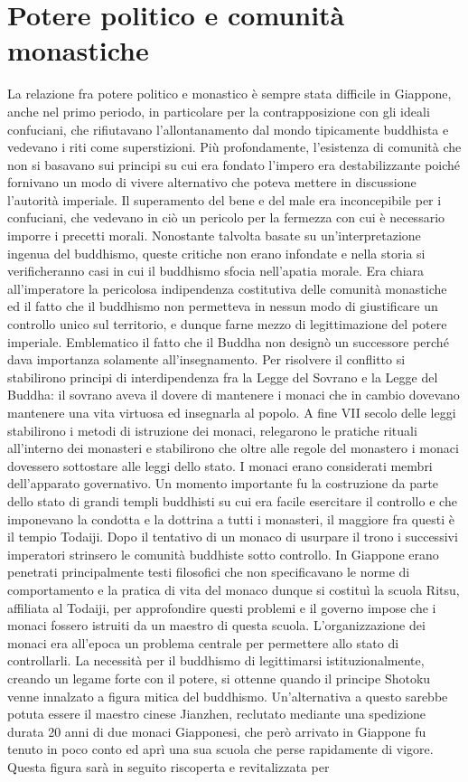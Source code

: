 \documentclass[10pt,a4paper]{report}
\begin{document}
\section{Potere politico e comunità monastiche}
La relazione fra potere politico e monastico è sempre stata difficile in Giappone, anche nel primo periodo, in particolare per la contrapposizione con gli ideali confuciani, che rifiutavano l'allontanamento dal mondo tipicamente buddhista e vedevano i riti come superstizioni. Più profondamente, l'esistenza di comunità che non si basavano sui principi su cui era fondato l'impero era destabilizzante poiché fornivano un modo di vivere alternativo che poteva mettere in discussione l'autorità imperiale. Il superamento del bene e del male era inconcepibile per i confuciani, che vedevano in ciò un pericolo per la fermezza con cui è necessario imporre i precetti morali. Nonostante talvolta basate su un'interpretazione ingenua del buddhismo, queste critiche non erano infondate e nella storia si verificheranno casi in cui il buddhismo sfocia nell'apatia morale. Era chiara all'imperatore la pericolosa indipendenza costitutiva delle comunità monastiche ed il fatto che il buddhismo non permetteva in nessun modo di giustificare un controllo unico sul territorio, e dunque farne mezzo di legittimazione del potere imperiale. Emblematico il fatto che il Buddha non designò un successore perché dava importanza solamente all'insegnamento. Per risolvere il conflitto si stabilirono principi di interdipendenza fra la Legge del Sovrano e la Legge del Buddha: il sovrano aveva il dovere di mantenere i monaci che in cambio dovevano mantenere una vita virtuosa ed insegnarla al popolo. A fine VII secolo delle leggi stabilirono i metodi di istruzione dei monaci, relegarono le pratiche rituali all'interno dei monasteri e stabilirono che oltre alle regole del monastero i monaci dovessero sottostare alle leggi dello stato. I monaci erano considerati membri dell'apparato governativo. Un momento importante fu la costruzione da parte dello stato di grandi templi buddhisti su cui era facile esercitare il controllo e che imponevano la condotta e la dottrina a tutti i monasteri, il maggiore fra questi è il tempio Todaiji. Dopo il tentativo di un monaco di usurpare il trono i successivi imperatori strinsero le comunità buddhiste sotto controllo. In Giappone erano penetrati principalmente testi filosofici che non specificavano le norme di comportamento e la pratica di vita del monaco dunque si costituì la scuola Ritsu, affiliata al Todaiji,  per approfondire questi problemi e il governo impose che i monaci fossero istruiti da un maestro di questa scuola. L'organizzazione dei monaci era all'epoca un problema centrale per permettere allo stato di controllarli. La necessità per il buddhismo di legittimarsi istituzionalmente, creando un legame forte con il potere, si ottenne quando il principe Shotoku venne innalzato a figura mitica del buddhismo. Un'alternativa a questo sarebbe potuta essere il maestro cinese Jianzhen, reclutato mediante una spedizione durata 20 anni di due monaci Giapponesi,  che però arrivato in Giappone fu tenuto in poco conto ed aprì una sua scuola che perse rapidamente di vigore. Questa figura sarà in seguito riscoperta e revitalizzata per 
\end{document}
